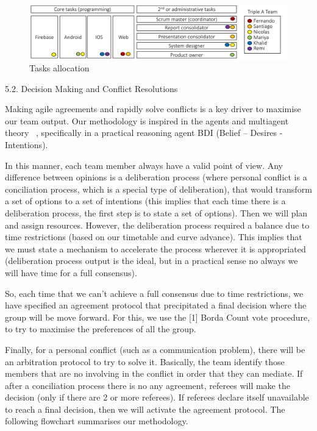 \begin{figure}[ht]
\centering
\includegraphics[width=1\textwidth]{figs/tasks}
	\caption{Tasks allocation}
	\label{fig:Tasks}
\end{figure}



5.2. Decision Making and Conflict Resolutions

Making agile agreements and rapidly solve conflicts is a key driver to maximise our team output. Our methodology is inspired in the agents and multiagent theory ~\cite{4646etyet}, specifically in a practical reasoning agent BDI (Belief – Desires - Intentions).

In this manner, each team member always have a valid point of view. Any difference between opinions is a deliberation process (where personal conflict is a conciliation process, which is a special type of deliberation), that would transform a set of options to a set of intentions (this implies that each time there is a deliberation process, the first step is to state a set of options). Then we will plan and assign resources. However, the deliberation process required a balance due to time restrictions (based on our timetable and curve advance). This implies that we must state a mechanism to accelerate the process wherever it is appropriated (deliberation process output is the ideal, but in a practical sense no always we will have time for a full consensus).

So, each time that we can’t achieve a full consensus due to time restrictions, we have specified an agreement protocol that precipitated a final decision where the group will be move forward. For this, we use the [1] Borda Count vote procedure, to try to maximise the preferences of all the group.

Finally, for a personal conflict (such as a communication problem), there will be an arbitration protocol to try to solve it. Basically, the team identify those members that are no involving in the conflict in order that they can mediate. If after a conciliation process there is no any agreement, referees will make the decision (only if there are 2 or more referees). If referees declare itself unavailable to reach a final decision, then we will activate the agreement protocol. The following flowchart summarises our methodology.

